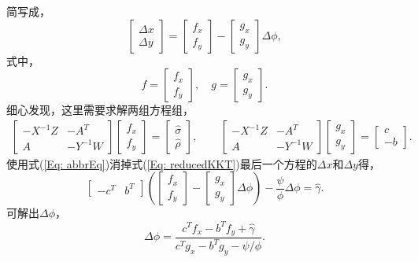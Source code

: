 \documentclass{ctexart}
\numberwithin{equation}{section} %
\begin{document}
简写成，
\begin{equation}
	\begin{bmatrix}
		\Delta x \\ \Delta y
	\end{bmatrix}
	= \begin{bmatrix}
	 f_x \\ f_y
	\end{bmatrix}
	- \begin{bmatrix}
		g_x \\ g_y
	\end{bmatrix}\Delta\phi,
\end{equation}
式中，
\begin{equation}
	f = \begin{bmatrix} f_x \\ f_y \end{bmatrix}, \quad
	g = \begin{bmatrix} g_x \\ g_y \end{bmatrix}. \nonumber
\end{equation}
细心发现，这里需要求解两组方程组，
\begin{eqnarray}
	\begin{bmatrix}
		-X^{-1}Z & -A^T \\
		A & -Y^{-1}W
	\end{bmatrix}
	\begin{bmatrix}
		f_x \\ f_y
	\end{bmatrix}
	= \begin{bmatrix}
		\hat{\sigma} \\ \hat{\rho}
	\end{bmatrix}, \qquad
	\begin{bmatrix}
		-X^{-1}Z & -A^T \\
		A & -Y^{-1}W
	\end{bmatrix}
	\begin{bmatrix}
		g_x \\ g_y
	\end{bmatrix}
	= \begin{bmatrix}
		c \\ -b
	\end{bmatrix}. \nonumber
\end{eqnarray}
使用式(\ref{Eq: abbrEq})消掉式(\ref{Eq: reducedKKT})最后一个方程的$ \Delta x $和$ \Delta y $得，
\begin{equation}
	\begin{bmatrix}
		-c^T & b^T
	\end{bmatrix}
	\left(\begin{bmatrix}
		f_x \\ f_y
	\end{bmatrix}
	-\begin{bmatrix}
		g_x \\ g_y
	\end{bmatrix}\Delta\phi
	\right)
	- \frac{\psi}{\phi}\Delta\phi = \hat{\gamma}. \nonumber
\end{equation}
可解出$ \Delta\phi $，
\begin{equation}
	\Delta\phi = \frac{c^Tf_x - b^Tf_y + \hat{\gamma}}{c^Tg_x - b^Tg_y - \psi/\phi}. \nonumber
\end{equation}
\end{document}
